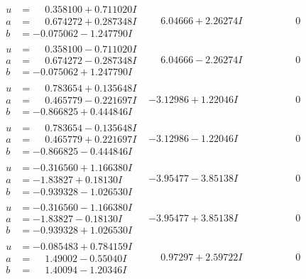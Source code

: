 \documentclass[1p]{elsarticle_modified}
\theoremstyle{definition}
\begin{document}
$$\begin{array}{c|c|c}
\begin{aligned}
u &= \phantom{-}0.358100 + 0.711020 I \\
a &= \phantom{-}0.674272 + 0.287348 I \\
b &= -0.075062 - 1.247790 I\end{aligned}
 & \phantom{-}6.04666 + 2.26274 I & \phantom{-0.000000 } 0 \\ \hline\begin{aligned}
u &= \phantom{-}0.358100 - 0.711020 I \\
a &= \phantom{-}0.674272 - 0.287348 I \\
b &= -0.075062 + 1.247790 I\end{aligned}
 & \phantom{-}6.04666 - 2.26274 I & \phantom{-0.000000 } 0 \\ \hline\begin{aligned}
u &= \phantom{-}0.783654 + 0.135648 I \\
a &= \phantom{-}0.465779 - 0.221697 I \\
b &= -0.866825 + 0.444846 I\end{aligned}
 & -3.12986 + 1.22046 I & \phantom{-0.000000 } 0 \\ \hline\begin{aligned}
u &= \phantom{-}0.783654 - 0.135648 I \\
a &= \phantom{-}0.465779 + 0.221697 I \\
b &= -0.866825 - 0.444846 I\end{aligned}
 & -3.12986 - 1.22046 I & \phantom{-0.000000 } 0 \\ \hline\begin{aligned}
u &= -0.316560 + 1.166380 I \\
a &= -1.83827 + 0.18130 I \\
b &= -0.939328 - 1.026530 I\end{aligned}
 & -3.95477 - 3.85138 I & \phantom{-0.000000 } 0 \\ \hline\begin{aligned}
u &= -0.316560 - 1.166380 I \\
a &= -1.83827 - 0.18130 I \\
b &= -0.939328 + 1.026530 I\end{aligned}
 & -3.95477 + 3.85138 I & \phantom{-0.000000 } 0 \\ \hline\begin{aligned}
u &= -0.085483 + 0.784159 I \\
a &= \phantom{-}1.49002 - 0.55040 I \\
b &= \phantom{-}1.40094 - 1.20346 I\end{aligned}
 & \phantom{-}0.97297 + 2.59722 I & \phantom{-0.000000 } 0 \\ \hline\begin{aligned}

\end{aligned}
\end{array}$$
\end{document}
